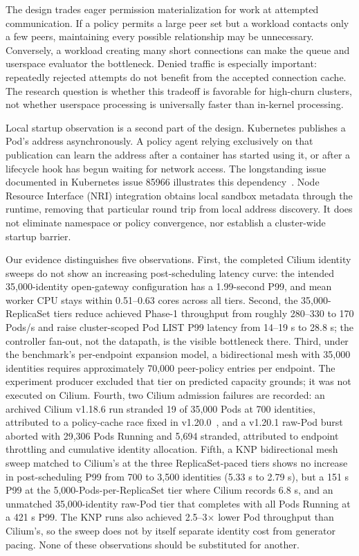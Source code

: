 \documentclass[letterpaper,twocolumn,10pt]{article}
\newcommand{\sys}{\textsc{KNP}}
\begin{document}
The design trades eager permission materialization for work at attempted
communication. If a policy permits a large peer set but a workload contacts
only a few peers, maintaining every possible relationship may be unnecessary.
Conversely, a workload creating many short connections can make the queue
and userspace evaluator the bottleneck. Denied traffic is especially
important: repeatedly rejected attempts do not benefit from the accepted
connection cache. The research question is whether this tradeoff is favorable
for high-churn clusters, not whether userspace processing is universally
faster than in-kernel processing.

Local startup observation is a second part of the design. Kubernetes
publishes a Pod's address asynchronously. A policy agent relying exclusively
on that publication can learn the address after a container has started
using it, or after a lifecycle hook has begun waiting for network access.
The longstanding issue documented in Kubernetes issue 85966 illustrates
this dependency~\cite{k8s85966}. Node Resource Interface (NRI) integration
obtains local sandbox metadata through the runtime, removing that particular
round trip from local address discovery. It does not eliminate namespace
or policy convergence, nor establish a cluster-wide startup barrier.

Our evidence distinguishes five observations. First, the completed
Cilium identity sweeps do not show an increasing post-scheduling latency
curve: the intended 35,000-identity open-gateway configuration has a
1.99-second P99, and mean worker CPU stays within 0.51--0.63 cores across
all tiers. Second, the 35,000-ReplicaSet tiers reduce achieved Phase-1
throughput from roughly 280--330 to 170 Pods/s and raise cluster-scoped
Pod LIST P99 latency from 14--19 s to 28.8 s; the controller fan-out, not
the datapath, is the visible bottleneck there. Third, under the benchmark's
per-endpoint expansion model, a bidirectional mesh with 35,000 identities
requires approximately 70,000 peer-policy entries per endpoint. The
experiment producer excluded that tier on predicted capacity grounds; it was
not executed on Cilium. Fourth, two Cilium admission failures are recorded: an archived
Cilium v1.18.6 run stranded 19 of 35,000 Pods at 700 identities, attributed
to a policy-cache race fixed in v1.20.0~\cite{cilium7515}, and a
v1.20.1 raw-Pod burst aborted with 29,306 Pods Running and 5,694 stranded,
attributed to endpoint throttling and cumulative identity allocation.
Fifth, a \sys{} bidirectional mesh sweep matched to Cilium's at the three
ReplicaSet-paced tiers shows no increase in post-scheduling P99 from 700
to 3,500 identities (5.33 s to 2.79 s), but a 151 s P99 at the
5,000-Pods-per-ReplicaSet tier where Cilium records 6.8 s, and an
unmatched 35,000-identity raw-Pod tier that completes with all Pods
Running at a 421 s P99. The \sys{} runs also achieved 2.5--3$\times$
lower Pod throughput than Cilium's, so the sweep does not by itself
separate identity cost from generator pacing. None
of these observations should be substituted for another.
\end{document}
